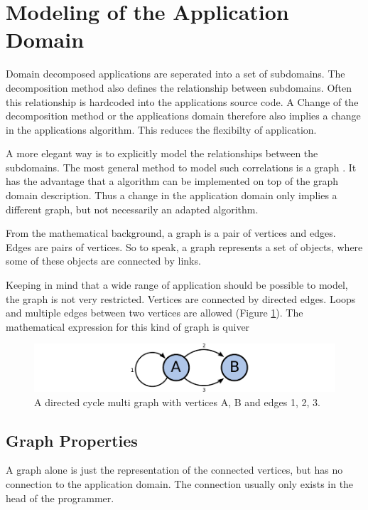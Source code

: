 \section{Modeling of the Application Domain}
\label{sec:graph}
Domain decomposed applications are seperated into a set of
subdomains. The decomposition method also defines the relationship
between subdomains. Often this relationship is hardcoded into the
applications source code. A Change of the decomposition method or the
applications domain therefore also implies a change in the
applications algorithm. This reduces the flexibilty of application.

A more elegant way is to explicitly model the relationships between
the subdomains. The most general method to model such correlations is
a graph \cite{ref:graph}. It has the advantage that a algorithm can be
implemented on top of the graph domain description. Thus a change in
the application domain only implies a different graph, but not
necessarily an adapted algorithm.

From the mathematical background, a graph is a pair of vertices and
edges. Edges are pairs of vertices. So to speak, a graph represents a
set of objects, where some of these objects are connected by links.

Keeping in mind that a wide range of application should be possible to
model, the graph is not very restricted. Vertices are connected by
directed edges. Loops and multiple edges between two vertices are
allowed (Figure \ref{fig:graph}). The mathematical expression for this
kind of graph is quiver \cite{ref:quiver}

\begin{figure}[H]
  \centering \includegraphics[width=\textwidth]{graphics/30_graph}
  \caption{ A directed cycle multi graph with vertices A, B and edges
    1, 2, 3.  }
  \label{fig:graph}
\end{figure}


\subsection{Graph Properties}
A graph alone is just the representation of the connected vertices,
but has no connection to the application domain. The connection
usually only exists in the head of the programmer.


